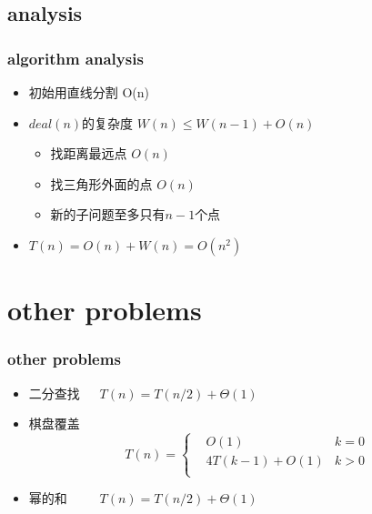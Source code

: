 \documentclass[cjk]{beamer}
\begin{document}
\begin{CJK*}{UTF8}{gbsn}
  \subsection{analysis}
    \begin{frame}
      \frametitle{algorithm analysis}
      \begin{itemize}
        \item 初始用直线分割  O(n)
        \item $deal(n)$的复杂度  $W(n) \leq W(n - 1) + O(n)$
          \begin{itemize}
            \item 找距离最远点   $O(n)$
            \item 找三角形外面的点 $O(n)$
            \item 新的子问题至多只有$n - 1$个点
          \end{itemize}
        \item $T(n) = O(n) + W(n) = O(n^2)$
      \end{itemize}
    \end{frame}
\section{other problems}
  \begin{frame}
    \frametitle{other problems}
    \begin{itemize}
      \item 二分查找  $\quad \  T(n) = T(n / 2) + \Theta(1)$
      \item 棋盘覆盖
        \begin{equation*}
          T(n) = \left\{
          \begin{aligned}
            & O(1) & k = 0 \\
            & 4T(k - 1) + O(1) & k > 0 \\
          \end{aligned}
          \right.
        \end{equation*}
      \item 幂的和 $\quad \quad \  T(n) = T(n / 2) + \Theta(1)$
    \end{itemize}
  \end{frame}
\end{CJK*}
\end{document}
